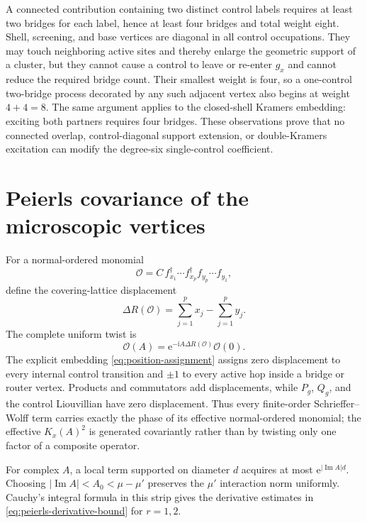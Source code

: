\documentclass[11pt]{article}
\theoremstyle{definition}
\theoremstyle{remark}
\newcommand{\I}{\mathrm i}
\newcommand{\e}{\mathrm e}
\newcommand{\abs}[1]{\lvert #1\rvert}
\begin{document}
A connected contribution containing two distinct control labels requires at least two bridges for each label, hence at least four bridges and total weight eight.  Shell, screening, and base vertices are diagonal in all control occupations.  They may touch neighboring active sites and thereby enlarge the geometric support of a cluster, but they cannot cause a control to leave or re-enter $g_x$ and cannot reduce the required bridge count.  Their smallest weight is four, so a one-control two-bridge process decorated by any such adjacent vertex also begins at weight $4+4=8$.  The same argument applies to the closed-shell Kramers embedding: exciting both partners requires four bridges.  These observations prove that no connected overlap, control-diagonal support extension, or double-Kramers excitation can modify the degree-six single-control coefficient.

\section{Peierls covariance of the microscopic vertices}
\label{app:peierls}

For a normal-ordered monomial
\begin{equation}
 \mathcal O=C\,f_{x_1}^\dagger\cdots f_{x_p}^\dagger f_{y_p}\cdots f_{y_1},
\end{equation}
define the covering-lattice displacement
\begin{equation}
 \Delta R(\mathcal O)=\sum_{j=1}^px_j-\sum_{j=1}^py_j.
\end{equation}
The complete uniform twist is
\begin{equation}
 \mathcal O(A)=\e^{-\I A\Delta R(\mathcal O)}\mathcal O(0).
\end{equation}
The explicit embedding \eqref{eq:position-assignment} assigns zero displacement to every internal control transition and $\pm1$ to every active hop inside a bridge or router vertex.  Products and commutators add displacements, while $P_g$, $Q_g$, and the control Liouvillian have zero displacement.  Thus every finite-order Schrieffer--Wolff term carries exactly the phase of its effective normal-ordered monomial; the effective $K_x(A)^2$ is generated covariantly rather than by twisting only one factor of a composite operator.

For complex $A$, a local term supported on diameter $d$ acquires at most $\e^{\abs{\operatorname{Im}A}d}$.  Choosing $\abs{\operatorname{Im}A}<A_0<\mu-\mu'$ preserves the $\mu'$ interaction norm uniformly.  Cauchy's integral formula in this strip gives the derivative estimates in \eqref{eq:peierls-derivative-bound} for $r=1,2$.
\end{document}
